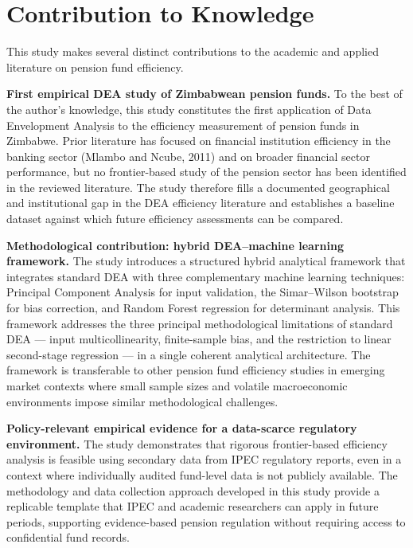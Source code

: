 \documentclass[12pt,a4paper]{article}
\begin{document}
\section{Contribution to Knowledge}

This study makes several distinct contributions to the academic and applied literature on pension fund efficiency.

\textbf{First empirical DEA study of Zimbabwean pension funds.} To the best of the author's knowledge, this study constitutes the first application of Data Envelopment Analysis to the efficiency measurement of pension funds in Zimbabwe. Prior literature has focused on financial institution efficiency in the banking sector (Mlambo and Ncube, 2011) and on broader financial sector performance, but no frontier-based study of the pension sector has been identified in the reviewed literature. The study therefore fills a documented geographical and institutional gap in the DEA efficiency literature and establishes a baseline dataset against which future efficiency assessments can be compared.

\textbf{Methodological contribution: hybrid DEA--machine learning framework.} The study introduces a structured hybrid analytical framework that integrates standard DEA with three complementary machine learning techniques: Principal Component Analysis for input validation, the Simar--Wilson bootstrap for bias correction, and Random Forest regression for determinant analysis. This framework addresses the three principal methodological limitations of standard DEA --- input multicollinearity, finite-sample bias, and the restriction to linear second-stage regression --- in a single coherent analytical architecture. The framework is transferable to other pension fund efficiency studies in emerging market contexts where small sample sizes and volatile macroeconomic environments impose similar methodological challenges.

\textbf{Policy-relevant empirical evidence for a data-scarce regulatory environment.} The study demonstrates that rigorous frontier-based efficiency analysis is feasible using secondary data from IPEC regulatory reports, even in a context where individually audited fund-level data is not publicly available. The methodology and data collection approach developed in this study provide a replicable template that IPEC and academic researchers can apply in future periods, supporting evidence-based pension regulation without requiring access to confidential fund records.
\end{document}
